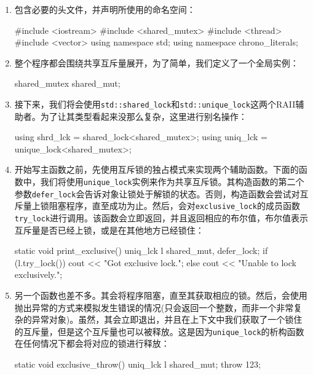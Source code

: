 \begin{enumerate}
\item 包含必要的头文件，并声明所使用的命名空间：

\begin{codebox}[cpp]
#include <iostream>
#include <shared_mutex>
#include <thread>
#include <vector>
using namespace std;
using namespace chrono_literals;
\end{codebox}

\item 整个程序都会围绕共享互斥量展开，为了简单，我们定义了一个全局实例：

\begin{codebox}[cpp]
shared_mutex shared_mut;
\end{codebox}

\item 接下来，我们将会使用\texttt{std::shared\_lock}和\texttt{std::unique\_lock}这两个RAII辅助者。为了让其类型看起来没那么复杂，这里进行别名操作：

\begin{codebox}[cpp]
using shrd_lck = shared_lock<shared_mutex>;
using uniq_lck = unique_lock<shared_mutex>;
\end{codebox}

\item 开始写主函数之前，先使用互斥锁的独占模式来实现两个辅助函数。下面的函数中，我们将使用\texttt{unique\_lock}实例来作为共享互斥锁。其构造函数的第二个参数\texttt{defer\_lock}会告诉对象让锁处于解锁的状态。否则，构造函数会尝试对互斥量上锁阻塞程序，直至成功为止。然后，会对\texttt{exclusive\_lock}的成员函数\texttt{try\_lock}进行调用。该函数会立即返回，并且返回相应的布尔值，布尔值表示互斥量是否已经上锁，或是在其他地方已经锁住：

\begin{codebox}[cpp]
static void print_exclusive()
{
    uniq_lck l {shared_mut, defer_lock};
    if (l.try_lock()) {
        cout << "Got exclusive lock.\n";
    } else {
        cout << "Unable to lock exclusively.\n";
    }
}
\end{codebox}

\item 另一个函数也差不多。其会将程序阻塞，直至其获取相应的锁。然后，会使用抛出异常的方式来模拟发生错误的情况(只会返回一个整数，而非一个非常复杂的异常对象)。虽然，其会立即退出，并且在上下文中我们获取了一个锁住的互斥量，但是这个互斥量也可以被释放。这是因为\texttt{unique\_lock}的析构函数在任何情况下都会将对应的锁进行释放：

\begin{codebox}[cpp]
static void exclusive_throw()
{
    uniq_lck l {shared_mut};
    throw 123;
}
\end{codebox}


\end{enumerate}

